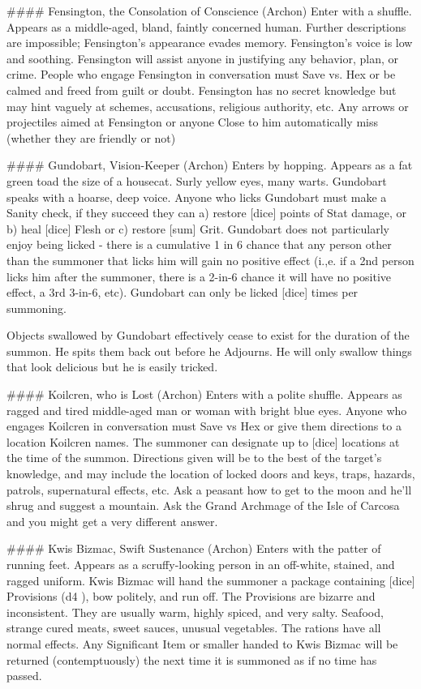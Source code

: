 ####  Fensington, the Consolation of Conscience (Archon)
Enter with a shuffle. Appears as a middle-aged, bland, faintly concerned human. Further descriptions are impossible; Fensington's appearance evades memory. Fensington's voice is low and soothing. Fensington will assist anyone in justifying any behavior, plan, or crime. People who engage Fensington in conversation must Save vs. Hex or be calmed and freed from guilt or doubt. Fensington has no secret knowledge but may hint vaguely at schemes, accusations, religious authority, etc. Any arrows or projectiles aimed at Fensington or anyone Close to him automatically miss (whether they are friendly or not)


####  Gundobart, Vision-Keeper (Archon)
Enters by hopping. Appears as a fat green toad the size of a housecat. Surly yellow eyes, many warts. Gundobart speaks with a hoarse, deep voice. Anyone who licks Gundobart must make a Sanity check, if they succeed they can a) restore [dice] points of Stat damage, or b) heal [dice] Flesh  or c) restore [sum] Grit.  Gundobart does not particularly enjoy being licked - there is a cumulative 1 in 6 chance that any person other than the summoner that licks him will gain no positive effect (i.,e.  if a 2nd person licks him after the summoner, there is a 2-in-6 chance it will have no positive effect, a 3rd 3-in-6, etc).  Gundobart can only be licked [dice] times per summoning.

Objects swallowed by Gundobart effectively cease to exist for the duration of the summon. He spits them back out before he Adjourns. He will only swallow things that look delicious but he is easily tricked.

####  Koilcren, who is Lost (Archon)
Enters with a polite shuffle. Appears as ragged and tired middle-aged man or woman with bright blue eyes. Anyone who engages Koilcren in conversation must Save vs Hex or give them directions to a location Koilcren names. The summoner can designate up to [dice] locations at the time of the summon. Directions given will be to the best of the target's knowledge, and may include the location of locked doors and keys, traps, hazards, patrols, supernatural effects, etc. Ask a peasant how to get to the moon and he'll shrug and suggest a mountain. Ask the Grand Archmage of the Isle of Carcosa and you might get a very different answer.  



####  Kwis Bizmac, Swift Sustenance (Archon)
Enters with the patter of running feet. Appears as a scruffy-looking person in an off-white, stained, and ragged uniform. Kwis Bizmac will hand the summoner a package containing [dice] Provisions (d4 \UD), bow politely, and run off. The Provisions are bizarre and inconsistent. They are usually warm, highly spiced, and very salty. Seafood, strange cured meats, sweet sauces, unusual vegetables. The rations have all normal effects. Any Significant Item or smaller handed to Kwis Bizmac will be returned (contemptuously) the next time it is summoned as if no time has passed.


